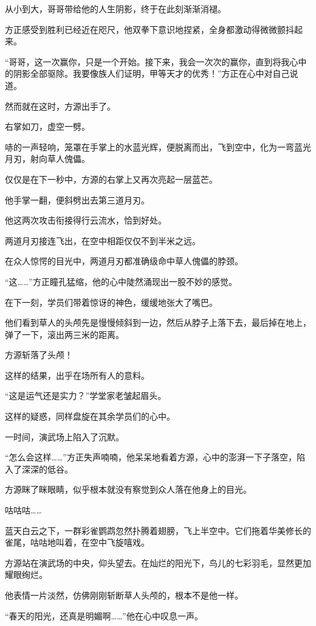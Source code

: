 \begin{this_body}
从小到大，哥哥带给他的人生阴影，终于在此刻渐渐消褪。

方正感受到胜利已经近在咫尺，他双拳下意识地捏紧，全身都激动得微微颤抖起来。

“哥哥，这一次赢你，只是一个开始。接下来，我会一次次的赢你，直到将我心中的阴影全部驱除。我要像族人们证明，甲等天才的优秀！”方正在心中对自己说道。

然而就在这时，方源出手了。

右掌如刀，虚空一劈。

哧的一声轻响，笼罩在手掌上的水蓝光辉，便脱离而出，飞到空中，化为一弯蓝光月刃，射向草人傀儡。

仅仅是在下一秒中，方源的右掌上又再次亮起一层蓝芒。

他手掌一翻，便斜劈出去第三道月刃。

他这两次攻击衔接得行云流水，恰到好处。

两道月刃接连飞出，在空中相距仅仅不到半米之远。

在众人惊愕的目光中，两道月刃都准确级命中草人傀儡的脖颈。

“这……”方正瞳孔猛缩，他的心中陡然涌现出一股不妙的感觉。

在下一刻，学员们带着惊讶的神色，缓缓地张大了嘴巴。

他们看到草人的头颅先是慢慢倾斜到一边，然后从脖子上落下去，最后掉在地上，弹了一下，滚出两三米的距离。

方源斩落了头颅！

这样的结果，出乎在场所有人的意料。

“这是运气还是实力？”学堂家老皱起眉头。

这样的疑惑，同样盘旋在其余学员们的心中。

一时间，演武场上陷入了沉默。

“怎么会这样……”方正失声喃喃，他呆呆地看着方源，心中的澎湃一下子落空，陷入了深深的低谷。

方源眯了眯眼睛，似乎根本就没有察觉到众人落在他身上的目光。

咕咕咕……

蓝天白云之下，一群彩雀鹦鹉忽然扑腾着翅膀，飞上半空中。它们拖着华美修长的雀尾，咕咕地叫着，在空中飞旋嘻戏。

方源站在演武场的中央，仰头望去。在灿烂的阳光下，鸟儿的七彩羽毛，显然更加耀眼绚烂。

他表情一片淡然，仿佛刚刚斩断草人头颅的，根本不是他一样。

“春天的阳光，还真是明媚啊……”他在心中叹息一声。

\end{this_body}

